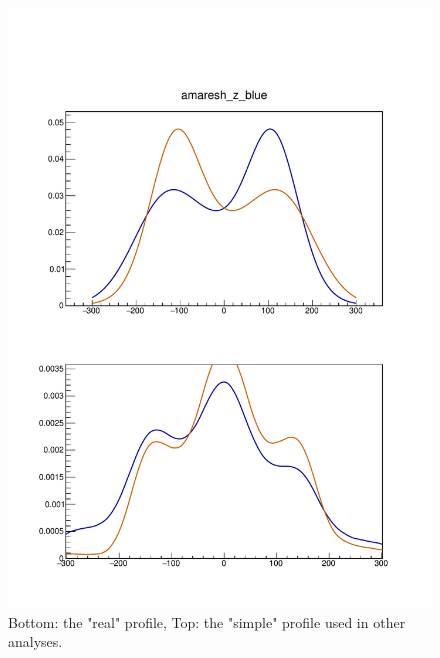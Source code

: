 \begin{frame}
\begin{columns}[onlytextwidth]
  \begin{column}{0.5\textwidth}
    \centering
    \begin{figure}
    \begin{center}
    \includegraphics[width=0.8\linewidth]{../AmareshComparison/figs/z_prof_comparison.pdf}
    \end{center}
    \caption{Bottom: the "real" profile, Top: the "simple" profile used in other analyses.}
    \label{fig:z_prof_comparison_amaresh_new}
    \end{figure}
  \end{column}
\end{columns}
\end{frame}

